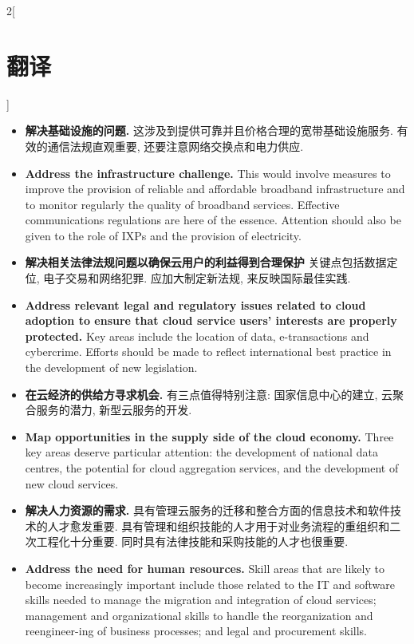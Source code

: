 \documentclass[a4paper, UTF8, 12pt]{article}
\begin{document}
\begin{paracol}{2}[\section{翻译}]
\begin{itemize}
        \switchcolumn*
        \item {\bfseries 解决基础设施的问题.} 这涉及到提供可靠并且价格合理的宽带基础设施服务. 有效的通信法规直观重要, 还要注意网络交换点和电力供应.
        \switchcolumn
        \item {\bfseries Address the infrastructure challenge.} This would involve measures to improve the provision of reliable and affordable broadband infrastructure and to monitor regularly the quality of broadband services. Effective communications regulations are here of the essence. Attention should also be given to the role of IXPs and the provision of electricity.
        
        \switchcolumn*
        \item {\bfseries 解决相关法律法规问题以确保云用户的利益得到合理保护} 关键点包括数据定位, 电子交易和网络犯罪. 应加大制定新法规, 来反映国际最佳实践.
        \switchcolumn
        \hypertarget{par:04}{}
        \item {\bfseries Address relevant legal	and	regulatory issues related to cloud	adoption to	ensure that cloud service	users’ interests are properly protected.} Key areas include the location of data, e-transactions and cybercrime. Efforts should be made to reflect international best practice in the development of new legislation. 
        
        \switchcolumn*
        \item {\bfseries 在云经济的供给方寻求机会.} 有三点值得特别注意: 国家信息中心的建立, 云聚合服务的潜力, 新型云服务的开发.
        \switchcolumn
        \item {\bfseries Map opportunities in the supply side of the	cloud economy.} Three key areas deserve particular attention: the development of national data centres, the potential for cloud aggregation services, and the development of new cloud services. 

        \switchcolumn*
        \item {\bfseries 解决人力资源的需求.} 具有管理云服务的迁移和整合方面的信息技术和软件技术的人才愈发重要. 具有管理和组织技能的人才用于对业务流程的重组织和二次工程化十分重要. 同时具有法律技能和采购技能的人才也很重要.
        \switchcolumn
        \hypertarget{par:05}{}
        \item {\bfseries Address the need for human resources.} Skill areas that are likely to become increasingly important include those related to the IT and software skills needed to manage the migration and integration of cloud services; management and organizational skills to handle the reorganization and reengineer-ing of business processes; and legal and procurement skills. 
        

\end{itemize}
\end{paracol}
\end{document}
